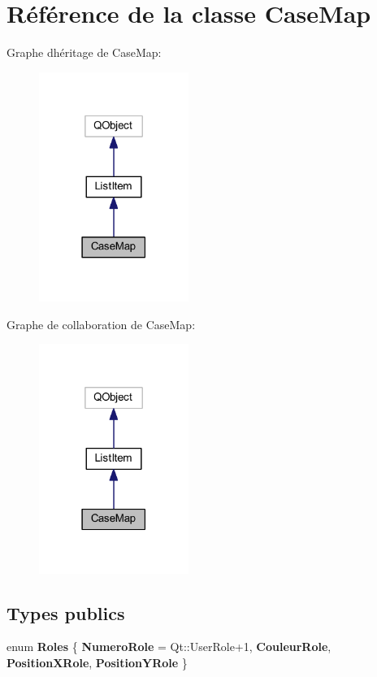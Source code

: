 \hypertarget{class_case_map}{}\section{Référence de la classe Case\+Map}
\label{class_case_map}


Graphe d\textquotesingle{}héritage de Case\+Map\+:
\nopagebreak
\begin{figure}[H]
\begin{center}
\leavevmode
\includegraphics[width=138pt]{class_case_map__inherit__graph}
\end{center}
\end{figure}


Graphe de collaboration de Case\+Map\+:
\nopagebreak
\begin{figure}[H]
\begin{center}
\leavevmode
\includegraphics[width=138pt]{class_case_map__coll__graph}
\end{center}
\end{figure}
\subsection*{Types publics}
\begin{DoxyCompactItemize}
\item 
enum {\bfseries Roles} \{ {\bfseries Numero\+Role} = Qt\+:\+:User\+Role+1, 
{\bfseries Couleur\+Role}, 
{\bfseries Position\+X\+Role}, 
{\bfseries Position\+Y\+Role}
 \}\hypertarget{class_case_map_aeebf794e83d6f860b091b207b6ec6994}{}\label{class_case_map_aeebf794e83d6f860b091b207b6ec6994}

\end{DoxyCompactItemize}
